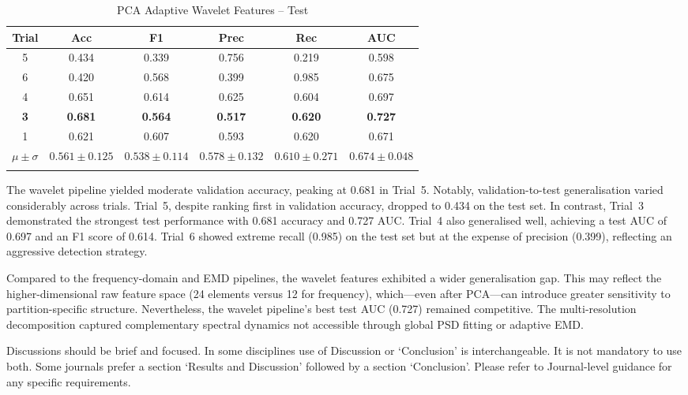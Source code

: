 \documentclass[pdflatex,sn-mathphys-num]{sn-jnl}%
\theoremstyle{thmstyleone}%
\theoremstyle{thmstyletwo}%
\theoremstyle{thmstylethree}%
\begin{document}
\begin{table}[h!]
\caption{PCA Adaptive Wavelet Features -- Test}\label{tab:wavelet_test}
{\footnotesize
\begin{tabular*}{\textwidth}{@{\extracolsep\fill}cccccc}
\toprule
Trial & Acc & F1 & Prec & Rec & AUC \\
\midrule
5 & 0.434 & 0.339 & 0.756 & 0.219 & 0.598 \\
6 & 0.420 & 0.568 & 0.399 & 0.985 & 0.675 \\
4 & 0.651 & 0.614 & 0.625 & 0.604 & 0.697 \\
\textbf{3} & \textbf{0.681} & \textbf{0.564} & \textbf{0.517} & \textbf{0.620} & \textbf{0.727} \\
1 & 0.621 & 0.607 & 0.593 & 0.620 & 0.671 \\
\midrule
$\mu{\pm}\sigma$ & $0.561{\pm}0.125$ & $0.538{\pm}0.114$ & $0.578{\pm}0.132$ & $0.610{\pm}0.271$ & $0.674{\pm}0.048$ \\
\botrule
\end{tabular*}
}
\end{table}

The wavelet pipeline yielded moderate validation accuracy, peaking at 0.681 in Trial~5. Notably, validation-to-test generalisation varied considerably across trials. Trial~5, despite ranking first in validation accuracy, dropped to 0.434 on the test set. In contrast, Trial~3 demonstrated the strongest test performance with 0.681 accuracy and 0.727 AUC. Trial~4 also generalised well, achieving a test AUC of 0.697 and an F1 score of 0.614. Trial~6 showed extreme recall (0.985) on the test set but at the expense of precision (0.399), reflecting an aggressive detection strategy.

Compared to the frequency-domain and EMD pipelines, the wavelet features exhibited a wider generalisation gap. This may reflect the higher-dimensional raw feature space (24 elements versus 12 for frequency), which—even after PCA—can introduce greater sensitivity to partition-specific structure. Nevertheless, the wavelet pipeline's best test AUC (0.727) remained competitive. The multi-resolution decomposition captured complementary spectral dynamics not accessible through global PSD fitting or adaptive EMD.


Discussions should be brief and focused. In some disciplines use of Discussion or `Conclusion' is interchangeable. It is not mandatory to use both. Some journals prefer a section `Results and Discussion' followed by a section `Conclusion'. Please refer to Journal-level guidance for any specific requirements. 
\end{document}
